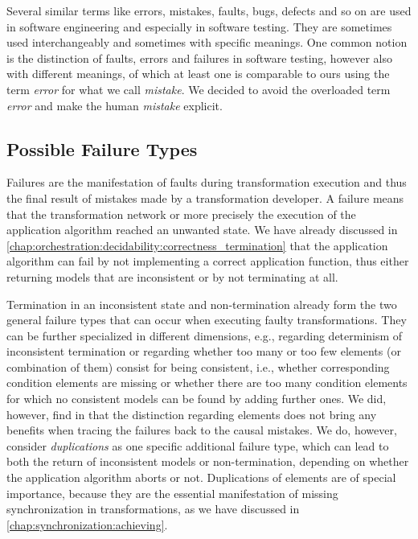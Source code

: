 Several similar terms like errors, mistakes, faults, bugs, defects and so on are used in software engineering and especially in software testing.
They are sometimes used interchangeably and sometimes with specific meanings.
One common notion is the distinction of faults, errors and failures in software testing, however also with different meanings, of which at least one is comparable to ours using the term \emph{error} for what we call \emph{mistake}.
We decided to avoid the overloaded term \emph{error} and make the human \emph{mistake} explicit.


\subsection{Possible Failure Types}
\label{chap:errors:categorization:failures}

Failures are the manifestation of faults during transformation execution and thus the final result of mistakes made by a transformation developer.
A failure means that the transformation network or more precisely the execution of the application algorithm reached an unwanted state.
We have already discussed in \autoref{chap:orchestration:decidability:correctness_termination} that the application algorithm can fail by not implementing a correct application function, thus either returning models that are inconsistent or by not terminating at all.

Termination in an inconsistent state and non-termination already form the two general failure types that can occur when executing faulty transformations.
They can be further specialized in different dimensions, e.g., regarding determinism of inconsistent termination or regarding whether too many or too few elements (or combination of them) consist for being consistent, i.e., whether corresponding condition elements are missing or whether there are too many condition elements for which no consistent models can be found by adding further ones.
We did, however, find in \cite[Table~5.7]{saglam2020ma} that the distinction regarding elements does not bring any benefits when tracing the failures back to the causal mistakes.
We do, however, consider \emph{duplications} as one specific additional failure type, which can lead to both the return of inconsistent models or non-termination, depending on whether the application algorithm aborts or not.
Duplications of elements are of special importance, because they are the essential manifestation of missing synchronization in transformations, as we have discussed in \autoref{chap:synchronization:achieving}.

